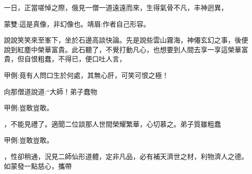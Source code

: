 \begin{parag}
    一日，正當嗟悼之際，俄見一僧一道遠遠而來，生得氣骨不凡，丰神迥異，\begin{note}蒙雙:這是真像，非幻像也。靖眉:作者自己形容。\end{note}說說笑笑來至峯下，坐於石邊高談快論。先是說些雲山霧海，神僊玄幻之事，後便說到紅塵中榮華富貴。此石聽了，不覺打動凡心，也想要到人間去享一享這榮華富貴，但自恨粗蠢，不得已，便口吐人言，\begin{note}甲側:竟有人問口生於何處，其無心肝，可笑可恨之極！\end{note}向那僧道說道:“大師！弟子蠢物\begin{note}甲側:豈敢豈敢。\end{note}，不能見禮了。適聞二位談那人世間榮耀繁華，心切慕之。弟子質雖粗蠢\begin{note}甲側:豈敢豈敢。\end{note}，性卻稍通，況見二師仙形道體，定非凡品，必有補天濟世之材，利物濟人之德。如蒙發一點慈心，攜帶
\end{parag}
